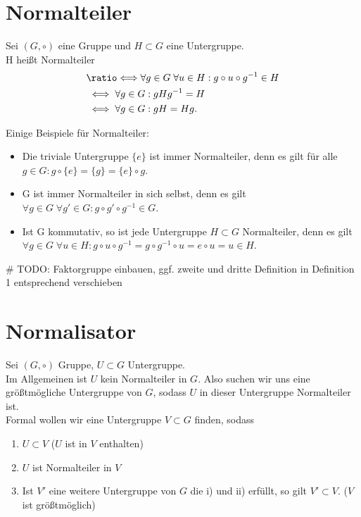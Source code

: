 \documentclass[a4paper]{article}
\newcommand*{\longeq}{\ratio\Longleftrightarrow}
\begin{document}
    \section{Normalteiler}
    \begin{definition}
        Sei $(G, \circ)$ eine Gruppe und $H \subset G$ eine Untergruppe. \\
        H heißt Normalteiler
        \begin{align*}
        &\longeq \forall g \in G \; \forall u \in H: g \circ u \circ g^{-1} \in H \\
        &\iff \forall g \in G: g H g^{-1} = H \\
        &\iff \forall g \in G: g H = H g
        .\end{align*}    
    \end{definition}
    \begin{beispiel}
        Einige Beispiele für Normalteiler:
        \begin{itemize}
            \item Die triviale Untergruppe $\{e\} $ ist immer Normalteiler, denn es gilt für alle $g \in G: g \circ \{e\} = \{g\} = \{e\} \circ g$.
            \item G ist immer Normalteiler in sich selbst, denn es gilt $\forall g \in G \; \forall g' \in G: g \circ g' \circ g^{-1} \in G$.
           \item Ist G kommutativ, so ist jede Untergruppe $H \subset G$ Normalteiler, denn es gilt $\forall g \in G \; \forall u \in H: g \circ u \circ g ^{-1} = g \circ g ^{-1} \circ u = e \circ u = u \in H$.
        \end{itemize}
    \end{beispiel}
    
    # TODO: Faktorgruppe einbauen, ggf. zweite und dritte Definition in Definition 1 entsprechend verschieben

    \section{Normalisator}
    Sei $\left( G, \circ  \right)$ Gruppe, $U \subset G$ Untergruppe. \\
    Im Allgemeinen ist $U$ kein Normalteiler in $G$. Also suchen wir uns eine größtmögliche Untergruppe von $G$, sodass $U$ in dieser Untergruppe Normalteiler ist. \\
    Formal wollen wir eine Untergruppe $V \subset G$ finden, sodass
    \begin{enumerate}
        \item $U \subset V$ ($U$ ist in $V$ enthalten)
        \item $U$ ist Normalteiler in $V$
        \item Ist $V'$ eine weitere Untergruppe von $G$ die i) und ii) erfüllt, so gilt $V' \subset V$. ($V$ ist größtmöglich)
    \end{enumerate}
\end{document}

